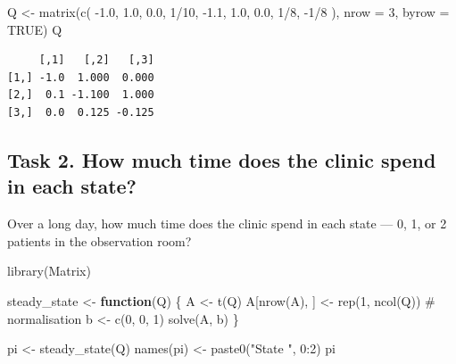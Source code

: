 \documentclass[
]{article}
\newenvironment{Shaded}{\begin{snugshade}}{\end{snugshade}}
\newcommand{\AttributeTok}[1]{\textcolor[rgb]{0.40,0.45,0.13}{#1}}
\newcommand{\CommentTok}[1]{\textcolor[rgb]{0.37,0.37,0.37}{#1}}
\newcommand{\ConstantTok}[1]{\textcolor[rgb]{0.56,0.35,0.01}{#1}}
\newcommand{\ControlFlowTok}[1]{\textcolor[rgb]{0.00,0.23,0.31}{\textbf{#1}}}
\newcommand{\DecValTok}[1]{\textcolor[rgb]{0.68,0.00,0.00}{#1}}
\newcommand{\FloatTok}[1]{\textcolor[rgb]{0.68,0.00,0.00}{#1}}
\newcommand{\FunctionTok}[1]{\textcolor[rgb]{0.28,0.35,0.67}{#1}}
\newcommand{\NormalTok}[1]{\textcolor[rgb]{0.00,0.23,0.31}{#1}}
\newcommand{\OtherTok}[1]{\textcolor[rgb]{0.00,0.23,0.31}{#1}}
\newcommand{\SpecialCharTok}[1]{\textcolor[rgb]{0.37,0.37,0.37}{#1}}
\newcommand{\StringTok}[1]{\textcolor[rgb]{0.13,0.47,0.30}{#1}}
\begin{document}
\begin{Shaded}
\begin{Highlighting}[]
\NormalTok{Q }\OtherTok{\textless{}{-}} \FunctionTok{matrix}\NormalTok{(}\FunctionTok{c}\NormalTok{(}
  \SpecialCharTok{{-}}\FloatTok{1.0}\NormalTok{,  }\FloatTok{1.0}\NormalTok{,  }\FloatTok{0.0}\NormalTok{,}
   \DecValTok{1}\SpecialCharTok{/}\DecValTok{10}\NormalTok{, }\SpecialCharTok{{-}}\FloatTok{1.1}\NormalTok{, }\FloatTok{1.0}\NormalTok{,}
   \FloatTok{0.0}\NormalTok{,  }\DecValTok{1}\SpecialCharTok{/}\DecValTok{8}\NormalTok{, }\SpecialCharTok{{-}}\DecValTok{1}\SpecialCharTok{/}\DecValTok{8}
\NormalTok{), }\AttributeTok{nrow =} \DecValTok{3}\NormalTok{, }\AttributeTok{byrow =} \ConstantTok{TRUE}\NormalTok{)}
\NormalTok{Q}
\end{Highlighting}
\end{Shaded}

\begin{verbatim}
     [,1]   [,2]   [,3]
[1,] -1.0  1.000  0.000
[2,]  0.1 -1.100  1.000
[3,]  0.0  0.125 -0.125
\end{verbatim}

\subsection{Task 2. How much time does the clinic spend in each
state?}\label{task-2.-how-much-time-does-the-clinic-spend-in-each-state}

Over a long day, how much time does the clinic spend in each state ---
0, 1, or 2 patients in the observation room?

\begin{Shaded}
\begin{Highlighting}[]
\FunctionTok{library}\NormalTok{(Matrix)}

\NormalTok{steady\_state }\OtherTok{\textless{}{-}} \ControlFlowTok{function}\NormalTok{(Q) \{}
\NormalTok{  A }\OtherTok{\textless{}{-}} \FunctionTok{t}\NormalTok{(Q)}
\NormalTok{  A[}\FunctionTok{nrow}\NormalTok{(A), ] }\OtherTok{\textless{}{-}} \FunctionTok{rep}\NormalTok{(}\DecValTok{1}\NormalTok{, }\FunctionTok{ncol}\NormalTok{(Q))  }\CommentTok{\# normalisation}
\NormalTok{  b }\OtherTok{\textless{}{-}} \FunctionTok{c}\NormalTok{(}\DecValTok{0}\NormalTok{, }\DecValTok{0}\NormalTok{, }\DecValTok{1}\NormalTok{)}
  \FunctionTok{solve}\NormalTok{(A, b)}
\NormalTok{\}}

\NormalTok{pi }\OtherTok{\textless{}{-}} \FunctionTok{steady\_state}\NormalTok{(Q)}
\FunctionTok{names}\NormalTok{(pi) }\OtherTok{\textless{}{-}} \FunctionTok{paste0}\NormalTok{(}\StringTok{"State "}\NormalTok{, }\DecValTok{0}\SpecialCharTok{:}\DecValTok{2}\NormalTok{)}
\NormalTok{pi}
\end{Highlighting}
\end{Shaded}
\end{document}
